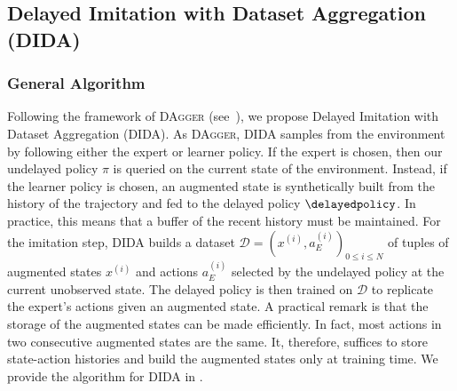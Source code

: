 \subsection{Delayed Imitation with
Dataset Aggregation (DIDA)}
\label{subsec:dida_algo}

\subsubsection{General Algorithm}
Following the framework of \textsc{DAgger} (see~), we propose Delayed Imitation with Dataset Aggregation (DIDA). 
As \textsc{DAgger}, DIDA samples from the environment by following either the expert or learner policy.
If the expert is chosen, then our undelayed policy $\pi$ is queried on the current state of the environment. Instead, if the learner policy is chosen, an augmented state is synthetically built from the history of the trajectory and fed to the delayed policy $\delayedpolicy$. 
In practice, this means that a buffer of the recent history must be maintained. 
For the imitation step, DIDA builds a dataset $\mathcal{D}=(x^{(i)},a_E^{(i)})_{0\le i\le N}$ of tuples of augmented states $x^{(i)}$ and actions $a_E^{(i)}$ selected by the undelayed policy at the current unobserved state. 
The delayed policy is then trained on $\mathcal{D}$ to replicate the expert's actions given an augmented state.
A practical remark is that the storage of the augmented states can be made efficiently. 
In fact, most actions in two consecutive augmented states are the same. 
It, therefore, suffices to store state-action histories and build the augmented states only at training time. 
We provide the algorithm for DIDA in .


